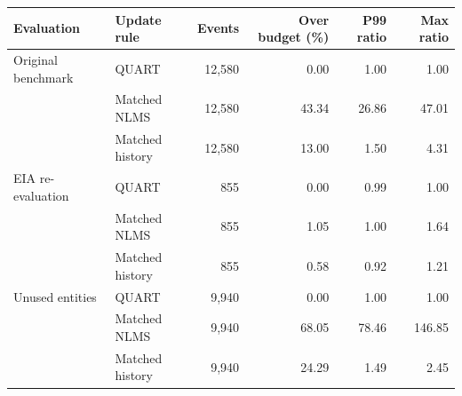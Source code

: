 \begin{tabular}{llrrrr}
\toprule
Evaluation & Update rule & Events & Over budget (\%) & P99 ratio & Max ratio\\
\midrule
Original benchmark & QUART & 12,580 & 0.00 & 1.00 & 1.00\\
 & Matched NLMS & 12,580 & 43.34 & 26.86 & 47.01\\
 & Matched history & 12,580 & 13.00 & 1.50 & 4.31\\
\addlinespace[3pt]
EIA re-evaluation & QUART & 855 & 0.00 & 0.99 & 1.00\\
 & Matched NLMS & 855 & 1.05 & 1.00 & 1.64\\
 & Matched history & 855 & 0.58 & 0.92 & 1.21\\
\addlinespace[3pt]
Unused entities & QUART & 9,940 & 0.00 & 1.00 & 1.00\\
 & Matched NLMS & 9,940 & 68.05 & 78.46 & 146.85\\
 & Matched history & 9,940 & 24.29 & 1.49 & 2.45\\
\bottomrule
\end{tabular}
